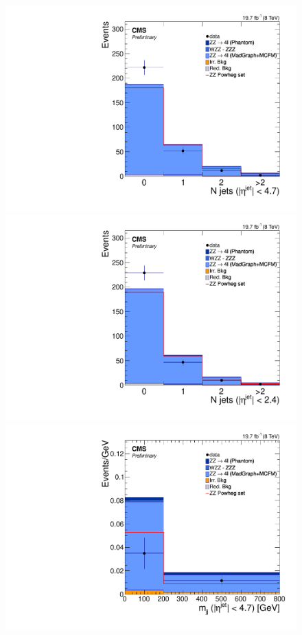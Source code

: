 \begin{figure}[hbtp]
  \begin{center}
    \includegraphics[width=\cmsFigWidth]{Figures/Jets_mad}
    \includegraphics[width=\cmsFigWidth]{Figures/CentralJets_mad}
    \includegraphics[width=\cmsFigWidth]{Figures/Mjj_mad}

\end{center}
\end{figure}
